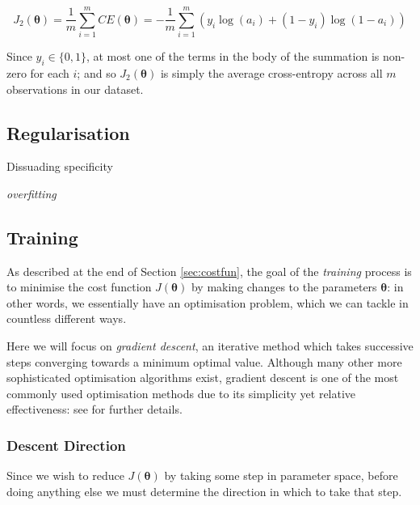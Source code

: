 \documentclass{article}[11pt]
\begin{document}
        $$
        J_2(\boldsymbol{\theta}) = \frac{1}{m} \sum_{i=1}^{m} CE(\boldsymbol{\theta}) = - \frac{1}{m} \sum_{i=1}^{m} \left( y_i \log(a_i) + (1 - y_i) \log(1 - a_i) \right)
        $$
        
        Since $y_i \in \{0, 1\}$, at most one of the terms in the body of the summation is non-zero for each $i$; and so $J_2(\boldsymbol{\theta})$ is simply the average cross-entropy across all $m$ observations in our dataset.
    
    
    
    \subsection{Regularisation}
        
        
        Dissuading specificity
        
        \textit{overfitting}
        
        
    \subsection{Training} \label{sec:gradient_descent}
        
        As described at the end of Section \ref{sec:costfun}, the goal of the \textit{training} process is to minimise the cost function $J(\boldsymbol{\theta})$ by making changes to the parameters $\boldsymbol{\theta}$: in other words, we essentially have an optimisation problem, which we can tackle in countless different ways.
        
        Here we will focus on \textit{gradient descent}, an iterative method which takes successive steps converging towards a minimum optimal value. Although many other more sophisticated optimisation algorithms exist, gradient descent is one of the most commonly used optimisation methods due to its simplicity yet relative effectiveness: see \cite{lecun_backprop} for further details.
        
        
        \subsubsection{Descent Direction}
            
            Since we wish to reduce $J(\boldsymbol{\theta})$ by taking some step in parameter space, before doing anything else we must determine the direction in which to take that step.
            
\end{document}
